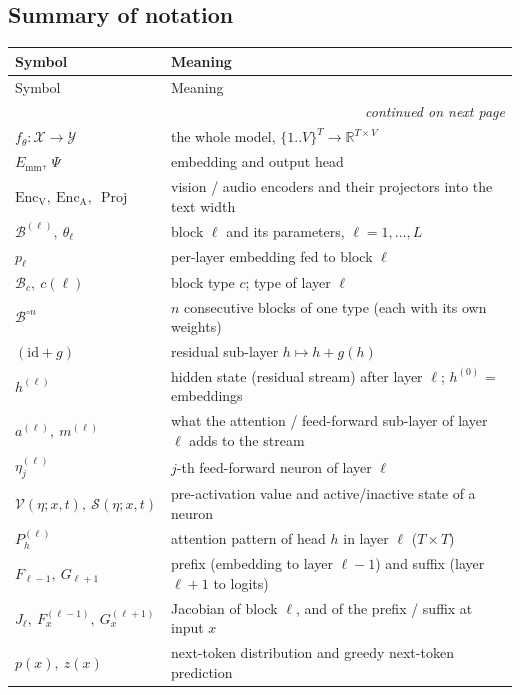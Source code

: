 \documentclass[10pt,a4paper]{article}
\newcommand{\op}[1]{\operatorname{#1}}
\theoremstyle{definition}
\begin{document}
\subsection{Summary of notation}
\begin{longtable}{l>{\raggedright\arraybackslash}p{10.5cm}}
\toprule
Symbol & Meaning \\
\midrule
\endfirsthead
\toprule
Symbol & Meaning \\
\midrule
\endhead
\midrule \multicolumn{2}{r}{\textit{continued on next page}} \\
\endfoot
\bottomrule
\endlastfoot
$f_\theta:\mathcal{X}\to\mathcal{Y}$ & the whole model, $\{1..V\}^T\to\mathbb{R}^{T\times V}$ \\
$E_{\mathrm{mm}},\ \Psi$ & embedding and output head \\
$\op{Enc_V},\ \op{Enc_A},\ \op{Proj}$ & vision / audio encoders and their projectors into the text width \\
$\mathcal{B}^{(\ell)},\ \theta_\ell$ & block $\ell$ and its parameters, $\ell=1,\dots,L$ \\
$p_\ell$ & per-layer embedding fed to block $\ell$ \\
$\mathcal{B}_c,\ c(\ell)$ & block type $c$; type of layer $\ell$ \\
$\mathcal{B}^{\circ n}$ & $n$ consecutive blocks of one type (each with its own weights) \\
$(\mathrm{id}+g)$ & residual sub-layer $h\mapsto h+g(h)$ \\
$h^{(\ell)}$ & hidden state (residual stream) after layer $\ell$; $h^{(0)}$ = embeddings \\
$a^{(\ell)},\ m^{(\ell)}$ & what the attention / feed-forward sub-layer of layer $\ell$ adds to the stream \\
$\eta^{(\ell)}_j$ & $j$-th feed-forward neuron of layer $\ell$ \\
$\mathcal{V}(\eta;x,t),\ \mathcal{S}(\eta;x,t)$ & pre-activation value and active/inactive state of a neuron \\
$P^{(\ell)}_h$ & attention pattern of head $h$ in layer $\ell$ ($T\times T$) \\
$F_{\ell-1},\ G_{\ell+1}$ & prefix (embedding to layer $\ell-1$) and suffix (layer $\ell+1$ to logits) \\
$J_\ell,\ F^{(\ell-1)}_x,\ G^{(\ell+1)}_x$ & Jacobian of block $\ell$, and of the prefix / suffix at input $x$ \\
$p(x),\ z(x)$ & next-token distribution and greedy next-token prediction \\
\end{longtable}
\end{document}
